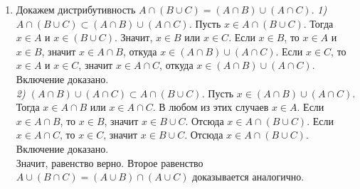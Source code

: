 \documentclass[12pt, a4paper]{article}
\begin{document}
\begin{enumerate}[label=\alph*)]
    \item 
    Докажем дистрибутивность \(A \cap (B \cup C) = (A \cap B) \cup (A \cap C)\).
    \textit{1) \(A \cap (B \cup C) \subset (A \cap B) \cup (A \cap C)\).} Пусть \(x \in A \cap (B \cup C)\). Тогда \(x \in A\) и \(x \in (B \cup C)\). Значит, \(x \in B\) или \(x \in C\).
    Если \(x \in B\), то \(x \in A\) и \(x \in B\), значит \(x \in A \cap B\), откуда \(x \in (A \cap B) \cup (A \cap C)\).
    Если \(x \in C\), то \(x \in A\) и \(x \in C\), значит \(x \in A \cap C\), откуда \(x \in (A \cap B) \cup (A \cap C)\).
    Включение доказано. \\
    \textit{2) \((A \cap B) \cup (A \cap C) \subset A \cap (B \cup C)\).} Пусть \(x \in (A \cap B) \cup (A \cap C)\). Тогда \(x \in A \cap B\) или \(x \in A \cap C\).
    В любом из этих случаев \(x \in A\). 
    Если \(x \in A \cap B\), то \(x \in B\), значит \(x \in B \cup C\). Отсюда \(x \in A \cap (B \cup C)\).
    Если \(x \in A \cap C\), то \(x \in C\), значит \(x \in B \cup C\). Отсюда \(x \in A \cap (B \cup C)\).
    Включение доказано. \\
    Значит, равенство верно. 
    Второе равенство \(A \cup (B \cap C) = (A \cup B) \cap (A \cup C)\) доказывается аналогично.
\end{enumerate}
\end{document}
